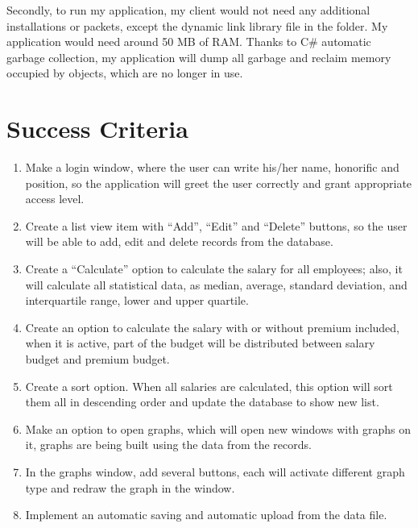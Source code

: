 \documentclass[a4paper]{article}
\begin{document}
Secondly, to run my application, my client would not need any additional installations or packets, except the dynamic link library file in the folder. My application would need around 50 MB of RAM. Thanks to C\# automatic garbage collection, my application will dump all garbage and reclaim memory occupied by objects, which are no longer in use.\\

\section*{Success Criteria}

\begin{enumerate}

\item Make a login window, where the user can write his/her name, honorific and position, so the application will greet the user correctly and grant appropriate access level.

\item Create a list view item with “Add”, “Edit” and “Delete” buttons, so the user will be able to add, edit and delete records from the database.

\item Create a “Calculate” option to calculate the salary for all employees; also, it will calculate all statistical data, as median, average, standard deviation, and interquartile range, lower and upper quartile.

\item Create an option to calculate the salary with or without premium included, when it is active, part of the budget will be distributed between salary budget and premium budget.

\item Create a sort option. When all salaries are calculated, this option will sort them all in descending order and update the database to show new list.

\item Make an option to open graphs, which will open new windows with graphs on it, graphs are being built using the data from the records.

\item In the graphs window, add several buttons, each will activate different graph type and redraw the graph in the window.

\item Implement an automatic saving and automatic upload from the data file.


\end{enumerate}
\end{document}
